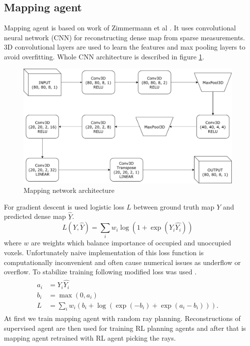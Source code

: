 \subsection{Mapping agent}
Mapping agent is based on work of Zimmermann et al \cite{zimmermann2017}. It uses convolutional neural network (CNN) for reconstructing dense map from sparse measurements. 3D convolutional layers are used to learn the features and max pooling layers to avoid overfitting. Whole CNN architecture is described in figure \ref{fig:supervised}.
\vspace{3mm}
\begin{figure}[!h]
\centering
\includegraphics[scale=0.6]{fig/supervised.pdf}
\caption{Mapping network architecture}
\label{fig:supervised}
\end{figure}

For gradient descent is used logistic loss $L$ between ground truth map $Y$ and predicted dense map $\hat{Y}$.
\begin{equation} \label{eq:loglos}
L(Y, \hat{Y}) = \sum\limits_i w_i \log(1 + \exp(Y_i \hat{Y_i}))
\end{equation}
where $w$ are weights which balance importance of occupied and unoccupied voxels.
\clearpage
Unfortunately naive implementation of this loss function is computationally inconvenient and often cause numerical issues as underflow or overflow. To stabilize training following modified loss was used \cite{matconvnet2015}.
\begin{align} 
\begin{split}
a_i &= Y_i \hat{Y_i} \\
b_i &= \max(0, a_i) \\
L &= \sum\limits_i w_i (b_i + \log(\exp(-b_i) + \exp(a_i-b_i))).
\end{split}
\end{align}
At first we train mapping agent with random ray planning. Reconstructions of supervised agent are then used for training RL planning agents and after that is mapping agent retrained with RL agent picking the rays.
